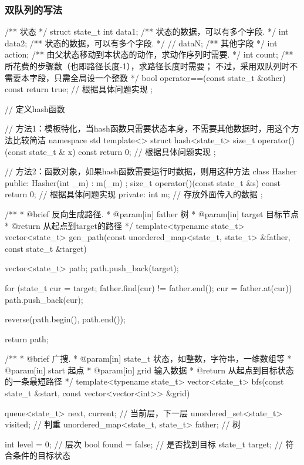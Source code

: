 \subsubsection{双队列的写法}
\begin{Codex}[label=bfs_template1.cpp]
/** 状态 */
struct state_t {
    int data1;  /** 状态的数据，可以有多个字段. */
    int data2;  /** 状态的数据，可以有多个字段. */
    // dataN;   /** 其他字段 */
    int action; /** 由父状态移动到本状态的动作，求动作序列时需要. */
    int count;  /** 所花费的步骤数（也即路径长度-1），求路径长度时需要；
                    不过，采用双队列时不需要本字段，只需全局设一个整数 */
    bool operator==(const state_t &other) const {
        return true;  // 根据具体问题实现
    }
};

// 定义hash函数

// 方法1：模板特化，当hash函数只需要状态本身，不需要其他数据时，用这个方法比较简洁
namespace std {
template<> struct hash<state_t> {
    size_t operator()(const state_t & x) const {
        return 0; // 根据具体问题实现
    }
};
}

// 方法2：函数对象，如果hash函数需要运行时数据，则用这种方法
class Hasher {
public:
    Hasher(int _m) : m(_m) {};
    size_t operator()(const state_t &s) const {
        return 0; // 根据具体问题实现
    }
private:
    int m; // 存放外面传入的数据
};


/**
 * @brief 反向生成路径.
 * @param[in] father 树
 * @param[in] target 目标节点
 * @return 从起点到target的路径
 */
template<typename state_t>
vector<state_t> gen_path(const unordered_map<state_t, state_t> &father,
        const state_t &target) {
    vector<state_t> path;
    path.push_back(target);

    for (state_t cur = target; father.find(cur) != father.end(); 
            cur = father.at(cur))
        path.push_back(cur);

    reverse(path.begin(), path.end());

    return path;
}

/**
 * @brief 广搜.
 * @param[in] state_t 状态，如整数，字符串，一维数组等
 * @param[in] start 起点
 * @param[in] grid 输入数据
 * @return 从起点到目标状态的一条最短路径
 */
template<typename state_t>
vector<state_t> bfs(const state_t &start, const vector<vector<int>> &grid) {
    queue<state_t> next, current; // 当前层，下一层
    unordered_set<state_t> visited; // 判重
    unordered_map<state_t, state_t> father; // 树

    int level = 0;  // 层次
    bool found = false; // 是否找到目标
    state_t target; // 符合条件的目标状态

}
\end{Codex}
